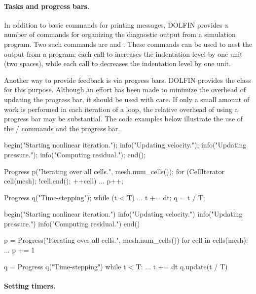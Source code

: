 \paragraph{Tasks and progress bars.}

In addition to basic commands for printing messages, DOLFIN provides a
number of commands for organizing the diagnostic output from a simulation
program. Two such commands are  and . These commands
can be used to nest the output from a program; each call to 
increases the indentation level by one unit (two spaces), while each
call to  decreases the indentation level by one unit.

Another way to provide feedback is via progress bars. DOLFIN provides
the  class for this purpose. Although an effort has been
made to minimize the overhead of updating the progress bar, it should
be used with care. If only a small amount of work is performed in each
iteration of a loop, the relative overhead of using a progress bar
may be substantial. The code examples below illustrate the use of the
/ commands and the progress bar.
\begin{c++}
begin("Starting nonlinear iteration.");
info("Updating velocity.");
info("Updating pressure.");
info("Computing residual.");
end();

Progress p("Iterating over all cells.", mesh.num_cells());
for (CellIterator cell(mesh); !cell.end(); ++cell)
{
  ...
  p++;
}

Progress q("Time-stepping");
while (t < T)
{
  ...
  t += dt;
  q = t / T;
}
\end{c++}
\begin{python}
begin("Starting nonlinear iteration.")
info("Updating velocity.")
info("Updating pressure.")
info("Computing residual.")
end()

p = Progress("Iterating over all cells.", mesh.num_cells())
for cell in cells(mesh):
  ...
  p += 1

q = Progress q("Time-stepping")
while t < T:
  ...
  t += dt
  q.update(t / T)
\end{python}


\paragraph{Setting timers.}

